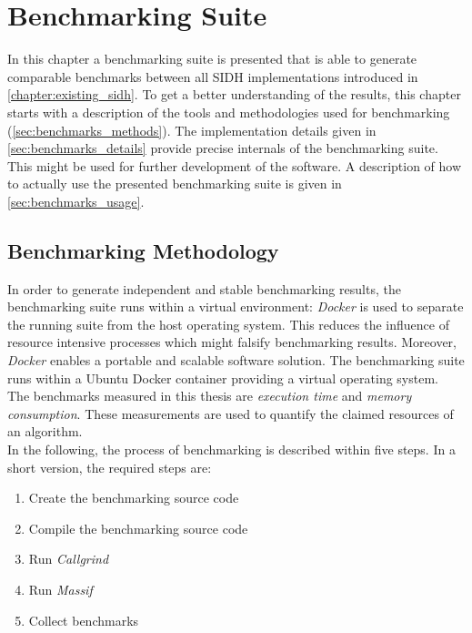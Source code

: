 \chapter{Benchmarking Suite}\label{chapter:benchmarking_suite}
In this chapter a benchmarking suite is presented that is able to generate comparable benchmarks between all \gls{SIDH} implementations introduced in \autoref{chapter:existing_sidh}. To get a better understanding of the results, this chapter starts with a  description of the tools and methodologies used for benchmarking (\autoref{sec:benchmarks_methods}). The implementation details given in \autoref{sec:benchmarks_details} provide precise internals of the benchmarking suite. This might be used for further development of the software. A description of how to actually use the presented benchmarking suite is given in \autoref{sec:benchmarks_usage}.

\section{Benchmarking Methodology}\label{sec:benchmarks_methods}
In order to generate independent and stable benchmarking results, the benchmarking suite runs within a virtual environment: \textit{Docker} is used to separate the running suite from the host operating system. This reduces the influence of resource intensive processes which might falsify benchmarking results. Moreover, \textit{Docker} enables a portable and scalable software solution. The benchmarking suite runs within a Ubuntu Docker container providing a virtual operating system.\\
The benchmarks measured in this thesis are \textit{execution time} and \textit{memory consumption}. These measurements are used to quantify the claimed resources of an algorithm. 
\\
In the following, the process of benchmarking is described within five steps. In a short version, the required steps are:

\begin{enumerate}
  \itemsep0em 
  \item Create the benchmarking source code
  \item Compile the benchmarking source code
  \item Run \textit{Callgrind}
  \item Run \textit{Massif}
  \item Collect benchmarks
\end{enumerate}

